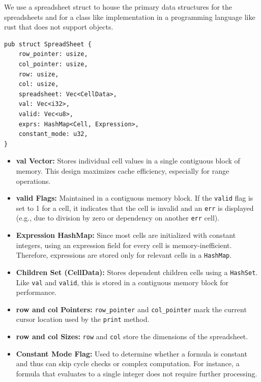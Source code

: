 \documentclass[12pt,a4paper]{cibb}
\begin{document}
We use a spreadsheet struct to house the primary data structures for the spreadsheets and for a class like implementation in a programming language like rust that does not support objects.

\begin{verbatim}
pub struct SpreadSheet {
    row_pointer: usize,
    col_pointer: usize,
    row: usize,
    col: usize,
    spreadsheet: Vec<CellData>,
    val: Vec<i32>,
    valid: Vec<u8>,
    exprs: HashMap<Cell, Expression>,
    constant_mode: u32,
}
\end{verbatim}


\begin{itemize}
    \item \textbf{val Vector:} Stores individual cell values in a single contiguous block of memory. This design maximizes cache efficiency, especially for range operations.
    
    \item \textbf{valid Flags:} Maintained in a contiguous memory block. If the \texttt{valid} flag is set to 1 for a cell, it indicates that the cell is invalid and an \texttt{err} is displayed (e.g., due to division by zero or dependency on another \texttt{err} cell).
    
    \item \textbf{Expression HashMap:} Since most cells are initialized with constant integers, using an expression field for every cell is memory-inefficient. Therefore, expressions are stored only for relevant cells in a \texttt{HashMap}.
    
    \item \textbf{Children Set (CellData):} Stores dependent children cells using a \texttt{HashSet}. Like \texttt{val} and \texttt{valid}, this is stored in a contiguous memory block for performance.
    
    \item \textbf{row and col Pointers:} \texttt{row\_pointer} and \texttt{col\_pointer} mark the current cursor location used by the \texttt{print} method.
    
    \item \textbf{row and col Sizes:} \texttt{row} and \texttt{col} store the dimensions of the spreadsheet.
    
    \item \textbf{Constant Mode Flag:} Used to determine whether a formula is constant and thus can skip cycle checks or complex computation. For instance, a formula that evaluates to a single integer does not require further processing.
\end{itemize}
\end{document}
